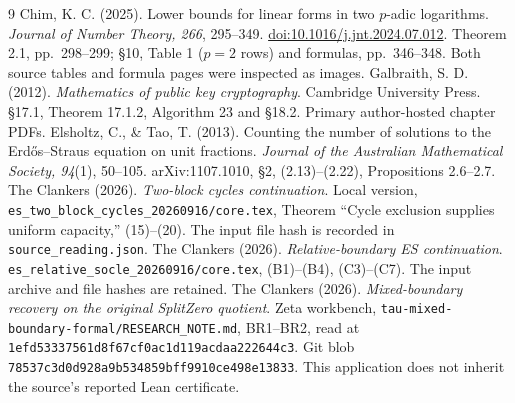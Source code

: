\begin{thebibliography}{9}
 Chim, K. C. (2025). Lower bounds for linear forms in two $p$-adic
logarithms. \emph{Journal of Number Theory, 266}, 295--349.
\href{https://doi.org/10.1016/j.jnt.2024.07.012}{doi:10.1016/j.jnt.2024.07.012}.
Theorem 2.1, pp.~298--299; \S10, Table 1 ($p=2$ rows) and formulas,
pp.~346--348. Both source tables and formula pages were inspected as images.
 Galbraith, S. D. (2012). \emph{Mathematics of public key
cryptography}. Cambridge University Press. \S17.1, Theorem 17.1.2,
Algorithm 23 and \S18.2. Primary author-hosted chapter PDFs.
 Elsholtz, C., \& Tao, T. (2013). Counting the number of solutions
to the Erd\H{o}s--Straus equation on unit fractions. \emph{Journal of the
Australian Mathematical Society, 94}(1), 50--105. arXiv:1107.1010,
\S2, (2.13)--(2.22), Propositions 2.6--2.7.
 The Clankers (2026). \emph{Two-block cycles continuation}.
Local version, \texttt{es\_two\_block\_cycles\_20260916/core.tex},
Theorem ``Cycle exclusion supplies uniform capacity,'' (15)--(20).
The input file hash is recorded in \texttt{source\_reading.json}.
 The Clankers (2026). \emph{Relative-boundary ES
continuation}. \texttt{es\_relative\_socle\_20260916/core.tex},
(B1)--(B4), (C3)--(C7). The input archive and file hashes are retained.
 The Clankers (2026). \emph{Mixed-boundary recovery on the
original SplitZero quotient}. Zeta workbench,
\texttt{tau-mixed-boundary-formal/RESEARCH\_NOTE.md}, BR1--BR2,
read at \texttt{1efd53337561d8f67cf0ac1d119acdaa222644c3}.
Git blob \texttt{78537c3d0d928a9b534859bff9910ce498e13833}.
This application does not inherit the source's reported Lean certificate.
\end{thebibliography}
